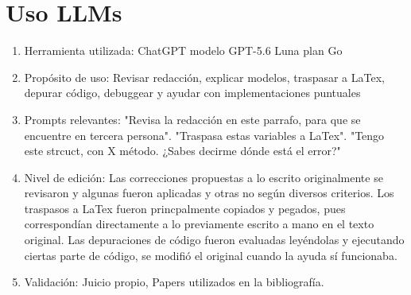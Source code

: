 \documentclass[letter, 10pt]{article}
\begin{document}
\section{Uso LLMs}
\begin{enumerate}
\item Herramienta utilizada: ChatGPT modelo GPT-5.6 Luna plan Go
\item Prop\'osito de uso: Revisar redacci\'on, explicar modelos, traspasar a LaTex, depurar c\'odigo, debuggear y ayudar con implementaciones puntuales
\item Prompts relevantes: "Revisa la redacci\'on en este parrafo, para que se encuentre en tercera persona". "Traspasa estas variables a LaTex". "Tengo este strcuct, con X m\'etodo. ¿Sabes decirme d\'onde est\'a el error?"
\item Nivel de edici\'on: Las correcciones propuestas a lo escrito originalmente se revisaron y algunas fueron aplicadas y otras no seg\'un diversos criterios. Los traspasos a LaTex fueron princpalmente copiados y pegados, pues correspond\'ian directamente a lo previamente escrito a mano en el texto original. Las depuraciones de c\'odigo fueron evaluadas ley\'endolas y ejecutando ciertas parte de c\'odigo, se modifi\'o el original cuando la ayuda s\'i funcionaba.
\item Validaci\'on: Juicio propio, Papers utilizados en la bibliograf\'ia.
\end{enumerate}




\end{document}
